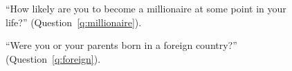
\begin{figure}[h!]
    \caption[Likelihood of becoming a millionaire]{``How likely are you to become a millionaire at some point in your life?'' (Question~\ref{q:millionaire}).
    }\label{fig:millionaire}
\end{figure}

\begin{figure}[h!]
    \caption[Foreign origin]{``Were you or your parents born in a foreign country?'' (Question~\ref{q:foreign}).
    }\label{fig:foreign}
\end{figure}

